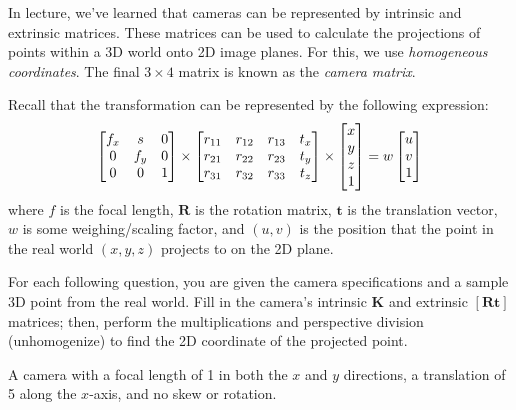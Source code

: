 \documentclass{csci1430}
\begin{document}
\pagebreak
\begin{question}[points=8,drawbox=false]
In lecture, we've learned that cameras can be represented by intrinsic and extrinsic matrices. These matrices can be used to calculate the projections of points within a 3D world onto 2D image planes. For this, we use \emph{homogeneous coordinates}. The final $3\times4$ matrix is known as the \emph{camera matrix}.

Recall that the transformation can be represented by the following expression:
\begin{align*}
    \begin{bmatrix} 
    f_x & s & $0$ \\ 
    $0$ & f_y & $0$ \\ 
    $0$ & $0$ & $1$ \end{bmatrix} \times
    \begin{bmatrix} 
    r_{11} & r_{12} & r_{13} & t_x \\ 
    r_{21} & r_{22} & r_{23} & t_y \\  
    r_{31} & r_{32} & r_{33} & t_z
    \end{bmatrix} \times 
    \begin{bmatrix} 
    x \\ 
    y \\ 
    z \\ 
    $1$ \end{bmatrix}
    = w
    \begin{bmatrix}  u \\ v \\ $1$ \end{bmatrix}
\end{align*}
where $f$ is the focal length, $\mathbf{R}$ is the rotation matrix, $\mathbf{t}$ is the translation vector,  $w$ is some weighing/scaling factor, and $(u, v)$ is the position that the point in the real world $(x, y, z)$ projects to on the 2D plane.

For each following question, you are given the camera specifications and a sample 3D point from the real world. Fill in the camera's intrinsic $\mathbf{K}$ and extrinsic $\mathbf{[Rt]}$ matrices; then, perform the multiplications and perspective division (unhomogenize) to find the 2D coordinate of the projected point.
\end{question}

\begin{subsubquestion}[points=1]
A camera with a focal length of 1 in both the $x$ and $y$ directions, a translation of 5 along the $x$-axis, and no skew or rotation.
\end{subsubquestion}
\end{document}
